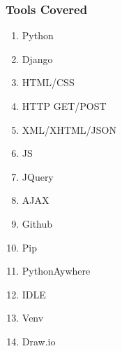 

\subsubsection{Tools Covered}
	
		\begin{multicols}{2} 
				\begin{enumerate}
					\item Python
					\item Django
					\item HTML/CSS
					\item HTTP GET/POST
					\item XML/XHTML/JSON
					\item JS
					\item JQuery
					\item AJAX
					\item Github
					\item Pip
					\item PythonAywhere
					\item IDLE
					\item Venv
					\item Draw.io
				\end{enumerate}
		\end{multicols}


